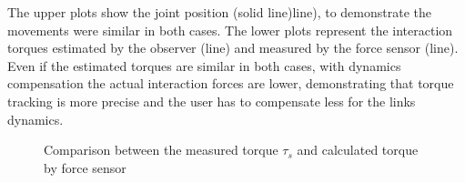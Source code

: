 \DIFaddend \par The upper plots show the joint position (\DIFdelbegin {}\DIFdelend \DIFaddbegin {}\DIFaddend solid line)\DIFdelbegin {}\DIFdelend \DIFaddbegin {}\DIFaddend line), to demonstrate the movements were similar in both cases. The lower plots represent the interaction torques estimated by the observer (\DIFdelbegin {}\DIFdelend \DIFaddbegin {}\DIFaddend line) and measured by the force sensor (\DIFdelbegin {}\DIFdelend \DIFaddbegin {}\DIFaddend line). Even if the estimated torques are similar in both cases, with dynamics compensation the actual interaction forces are lower, demonstrating that torque tracking is more precise and the user has to compensate less for the links dynamics.

\DIFdelbegin %
\DIFdelend %
\DIFaddbegin 

\begin{figure*}[htb]
	\DIFaddendFL \centering
	\DIFdelbeginFL %
\DIFdelendFL \DIFaddbeginFL \def\svgwidth{2\columnwidth}
	\begin{footnotesize}
		
	\end{footnotesize}
	\DIFaddendFL \caption{Comparison between the measured torque $\tau_s$ and calculated torque by force sensor \DIFaddbeginFL {}\DIFaddendFL }
	\label{fig:torque_validation}
\DIFdelbeginFL %
\DIFdelendFL \DIFaddbeginFL \end{figure*}
\DIFaddend 

